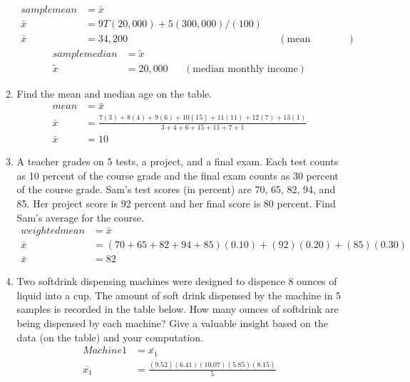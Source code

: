 \documentclass{article}
\begin{document}
\begin{enumerate}
\begin{enumerate}
                    \begin{align*}
                        sample mean&=\bar{x} \\
                        \bar{x}&=9T(20,000)+5(300,000)/(100) \\
                        \bar{x}&=34,200 && (\text{mean monthly income})
                    \end{align*}
                    \begin{align*}
                        sample median&=\tilde{x} \\
                        \tilde{x}&=20,000 && (\text{median monthly income})
                    \end{align*}
            \item Find the mean and median age on the table.
                    \begin{align*}
                        mean&=\bar{x} \\
                        \bar{x}&=\frac{7(3)+8(4)+9(6)+10(15)+11(11)+12(7)+13(1)}{3+4+6+15+11+7+1} \\
                        \bar{x}&=10
                    \end{align*}
            \item A teacher grades on 5 tests, a project, and a final exam. Each test counts as 10 percent of the course grade and the final exam counts as 30 percent of the course grade. Sam's test scores (in percent) are 70, 65, 82, 94, and 85. Her project score is 92 percent and her final score is 80 percent. Find Sam's average for the course.
                    \begin{align*}
                        weighted mean&=\bar{x} \\
                        \bar{x}&=(70+65+82+94+85)(0.10)+(92)(0.20)+(85)(0.30) \\
                        \bar{x}&=82
                    \end{align*}                  
            \item Two softdrink dispensing machines were designed to dispence 8 ounces of liquid into a cup. The amount of soft drink dispensed by the machine in 5 samples is recorded in the table below. How many ounces of softdrink are being dispensed by each machine? Give a valuable insight based on the data (on the table) and your computation.
                    \begin{align*}
                        Machine 1&=\bar{x_1} \\
                        \bar{x_1}&=\frac{(9.52)(6.41)(10.07)(5.85)(8.15)}{5} \\

\end{align*}
\end{enumerate}
\end{enumerate}
\end{document}
